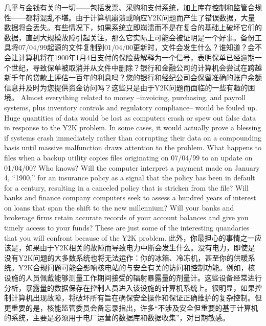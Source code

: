 \begin{paracol}{2}
\switchcolumn*
几乎与金钱有关的一切——包括发票、采购和支付系统，加上库存控制和监管合规性——都将混乱不堪。由于计算机崩溃或响应Y2K问题而产生了错误数据，大量数据将会丢失。有些情况下，如果系统立即崩溃而不是在复合的基础上破坏它们的数据，直到大规模故障引起关注，那么它实际上可能会被证明是一个好事。备份工具将07/04/99起源的文件复制到01/04/00更新时，文件会发生什么？谁知道？会不会让计算机将在1900年1月4日支付的保险费解释为一个信号，表明保单已经逾期一个世纪，导致保单被取消并从文件中删除？银行和金融公司的计算机会尝试在跨越新千年的贷款上评估一百年的利息吗？您的银行和经纪公司会保留准确的账户余额信息并及时为您提供资金访问吗？这些只是由于Y2K问题而面临的一些有趣的困境。
\switchcolumn
Almost everything related to money --invoicing, purchasing, and payroll systems, plus inventory controls and regulatory compliance-- would be fouled up. Huge quantities of data would be lost as computers crash or spew out false data in response to the Y2K problem. In some cases, it would actually prove a blessing if systems crash immediately rather than corrupting their data on a compounding basis until massive malfunction draws attention to the problem. What happens to files when a backup utility copies files originating on 07/04/99 to an update on 01/04/00? Who knows? Will the computer interpret a payment made on January 4, ``1900,'' for an insurance policy as a signal that the policy has been in default for a century, resulting in a canceled policy that is stricken from the file? Will banks and finance company computers seek to assess a hundred years of interest on loans that span the shift to the new millennium? Will your banks and brokerage firms retain accurate records of your account balances and give you timely access to your funds? These are just some of the interesting quandaries that you will confront because of the Y2K problem.
\switchcolumn*
此外，你最担心的事情之一应该是，如果由于Y2K相关的故障而导致电力中断会发生什么。没有电力，即使是没有Y2K问题的大多数系统也将无法运作：你的冰箱、冷冻机，甚至你的供暖系统。Y2K合规问题可能会影响核电站的与安全有关的访问和控制功能。例如，核设施的人员佩戴能够测量工作期间接受的辐射暴露量的剂量计。这些设备经常进行分析，暴露量的数据保存在控制人员进入该设施的计算机系统上。很明显，如果控制计算机出现故障，将破坏所有旨在确保安全操作和保证正确维护的复杂控制。但更重要的是，核能监管委员会备忘录指出，许多“不涉及安全但重要的基于计算机的系统，主要是必须用于电厂运营的数据库和数据收集”，对日期敏感。
\switchcolumn

\end{paracol}
